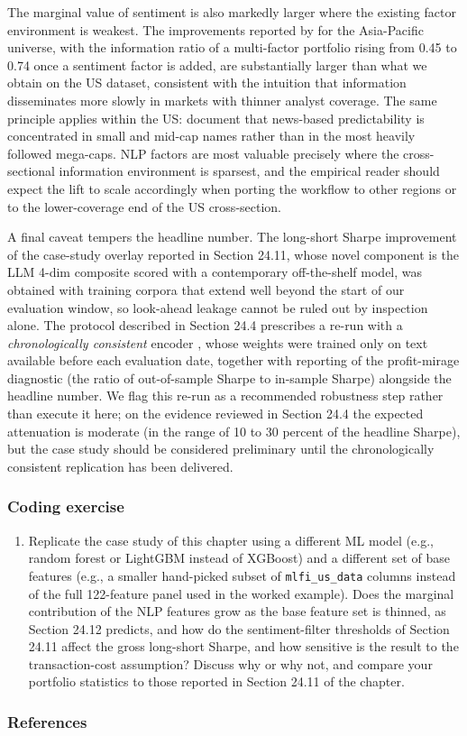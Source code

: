 The marginal value of sentiment is also markedly larger where the existing factor environment is weakest. The improvements reported by \cite{kangrga2020factor} for the Asia-Pacific universe, with the information ratio of a multi-factor portfolio rising from 0.45 to 0.74 once a sentiment factor is added, are substantially larger than what we obtain on the US dataset, consistent with the intuition that information disseminates more slowly in markets with thinner analyst coverage. The same principle applies within the US: \cite{hafez2014web} document that news-based predictability is concentrated in small and mid-cap names rather than in the most heavily followed mega-caps. NLP factors are most valuable precisely where the cross-sectional information environment is sparsest, and the empirical reader should expect the lift to scale accordingly when porting the workflow to other regions or to the lower-coverage end of the US cross-section.

A final caveat tempers the headline number. The long-short Sharpe improvement of the case-study overlay reported in Section 24.11, whose novel component is the LLM 4-dim composite scored with a contemporary off-the-shelf model, was obtained with training corpora that extend well beyond the start of our evaluation window, so look-ahead leakage cannot be ruled out by inspection alone. The protocol described in Section 24.4 prescribes a re-run with a \textit{chronologically consistent} encoder \citep{he2025chronologically}, whose weights were trained only on text available before each evaluation date, together with reporting of the profit-mirage diagnostic (the ratio of out-of-sample Sharpe to in-sample Sharpe) alongside the headline number. We flag this re-run as a recommended robustness step rather than execute it here; on the evidence reviewed in Section 24.4 the expected attenuation is moderate (in the range of 10 to 30 percent of the headline Sharpe), but the case study should be considered preliminary until the chronologically consistent replication has been delivered.

\subsubsection{Coding exercise}

\begin{enumerate}
\item Replicate the case study of this chapter using a different ML model
(e.g., random forest or LightGBM instead of XGBoost) and a different set of
base features (e.g., a smaller hand-picked subset of \texttt{mlfi\_us\_data} columns
instead of the full 122-feature panel used in the worked example). Does the
marginal contribution of the NLP features grow as the base feature set is
thinned, as Section 24.12 predicts, and how do the sentiment-filter
thresholds of Section 24.11 affect the gross long-short Sharpe, and how
sensitive is the result to the transaction-cost assumption? Discuss why or why not, and
compare your portfolio statistics to those reported in Section 24.11 of the
chapter.
\end{enumerate}

\subsubsection{References}